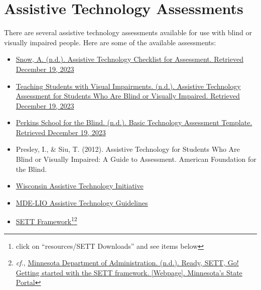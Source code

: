 \pagebreak \hypertarget{trouble4}{}\section[Assistive Technology Assessments]{Assistive Technology Assessments}\label{trouble4}
There are several assistive technology assessments available for use with blind or visually impaired people. Here are some of the available assessments:
\begin{itemize}[leftmargin=*]
 \item \href{https://www.teachingvisuallyimpaired.com/assistive-technology-assessment.html}{Snow, A. (n.d.). Assistive Technology Checklist for Assessment. Retrieved December 19, 2023} 
 \item \href{http://www.teachingvisuallyimpaired.com/uploads/1/4/1/2/14122361/at\_assessment\_revised.pdf}{Teaching Students with Visual Impairments. (n.d.). Assistive Technology Assessment for Students Who Are Blind or Visually Impaired. Retrieved December 19, 2023}
 \item \href{https://www.perkins.org/sites/elearning.perkinsdev1.org/files/Basic\%20Technology\%20Assessment\%20Template\_0\_0.docx}{Perkins School for the Blind. (n.d.). Basic Technology Assessment Template. Retrieved December 19, 2023}
 \item Presley, I., \& Siu, T. (2012). Assistive Technology for Students Who Are Blind or Visually Impaired: A Guide to Assessment. American Foundation for the Blind.
 \item \href{https://www.wati.org/free-publications/assessing-students-needs-for-assistive-technology/}{Wisconsin Assistive Technology Initiative}
 \item \href{https://mdelio.org/blind-visually-impaired/educator-support/assistive-technology-guidelines}{MDE-LIO Assistive Technology Guidelines}
 \item \href{https://www.joyzabala.com/links-resources}{SETT Framework}\footnote{\raggedright click on ``resources/SETT Downloads'' and see items below}\fnsep\footnote{\raggedright \textit{cf.}, \href{https://mn.gov/admin/at/getting-started/ready-sett-go.jsp}{Minnesota Department of Administration. (n.d.). Ready, SETT, Go! Getting started with the SETT framework. [Webpage]. Minnesota’s State Portal}}
  
\end{itemize}